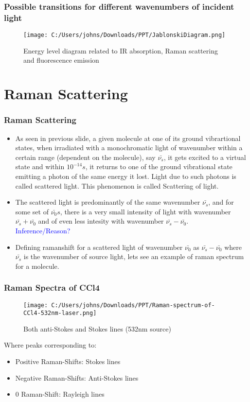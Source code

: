 \documentclass{beamer}
\begin{document}
\begin{frame}
\frametitle{Possible transitions for different wavenumbers of incident light}
\begin{figure}[ht]
  \centering
  \texttt{[image: C:/Users/johns/Downloads/PPT/JablonskiDiagram.png]}
  \caption{Energy level diagram related to IR absorption, Raman scattering and fluorescence emission}
  \label{fig:jablonski}
\end{figure}
\end{frame}

\section{Raman Scattering}
\begin{frame}
\frametitle{Raman Scattering}
\begin{itemize}[\textbullet]
\item As seen in previous slide, a given molecule at one of its ground vibrartional states, when irradiated with a monochromatic light of wavenumber within a certain range (dependent on the molecule), say $\bar{\nu_s}$, it gets excited to a virtual state and within $10^{-14} s$, it returns to one of the ground vibrational state emitting a photon of the same energy it lost. Light due to such photons is called scattered light. This phenomenon is called Scattering of light. 
\item The scattered light is predominantly of the same wavenumber $\bar{\nu_s}$, and for some set of $\bar{\nu_0}s$, there is a very small intensity of light with wavenumber $\bar{\nu_s}+\bar{\nu_0}$ and of even less intesity with wavenumber $\bar{\nu_s}-\bar{\nu_0}$.\\
\textcolor{blue}{Inference/Reason?}
\item Defining ramanshift for a scattered light of wavenumber $\bar{\nu_0}$ as $\bar{\nu_s}-\bar{\nu_0}$ where $\bar{\nu_s}$ is the wavenumber of source light, lets see an example of raman spectrum for a molecule.
\end{itemize}
\end{frame}


\begin{frame}
\frametitle{Raman Spectra of CCl4}
\begin{figure}[ht]
  \centering
  \texttt{[image: C:/Users/johns/Downloads/PPT/Raman-spectrum-of-CCl4-532nm-laser.png]}
    \caption{Both anti-Stokes and Stokes lines (532nm source)}
    \label{fig:left}
\end{figure}
Where peaks corresponding to: 
\begin{itemize}[\textbullet]
\item{Positive Raman-Shifts: Stokes lines} 
\item{Negative Raman-Shifts:  Anti-Stokes lines} 
\item{0 Raman-Shift:  Rayleigh lines} 
\end{itemize}
\end{frame}
\end{document}
